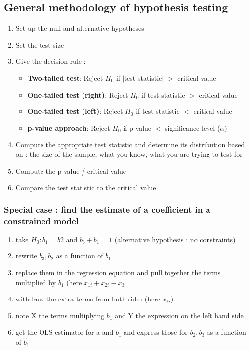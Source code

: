 \documentclass{article}
\begin{document}
\subsection{General methodology of hypothesis testing}
\begin{enumerate}
    \item Set up the null and alternative hypotheses 
    \item Set the test size
    \item Give the decision rule : 
    \begin{decisionbox}
        \begin{itemize}
          \item \textbf{Two-tailed test}: Reject $H_0$ if $|$test statistic$|$ $>$ critical value
          \item \textbf{One-tailed test (right)}: Reject $H_0$ if test statistic $>$ critical value
          \item \textbf{One-tailed test (left)}: Reject $H_0$ if test statistic $<$ critical value
          \item \textbf{p-value approach}: Reject $H_0$ if p-value $<$ significance level ($\alpha$)
        \end{itemize}
    \end{decisionbox}
    \item Compute the appropriate test statistic and determine its distribution based on : the size of the sample, what you know, what you are trying to test for
    \item Compute the p-value / critical value
    \item Compare the test statistic to the critical value
\end{enumerate}

\subsubsection{Special case : find the estimate of a coefficient in a constrained model}
\begin{enumerate}
    \item take $H_0 : b_1 =b2$ and $b_3+b_1=1$ (alternative hypothesis : no constraints)
    \item rewrite $b_3, b_2$ as a function of $b_1$
    \item replace them in the regression equation and pull together the terms multiplied by $b_1$ (here $x_{1i}+x_{2i}-x_{3i}$
    \item withdraw the extra terms from both sides (here $x_{3i}$)
    \item note X the terms multiplying $b_1$ and Y the expression on the left hand side
    \item get the OLS estimator for a and $b_1$ and express those for $b_2,b_3$ as a function of $\hat{b}_1$
    
\end{enumerate}
\end{document}
